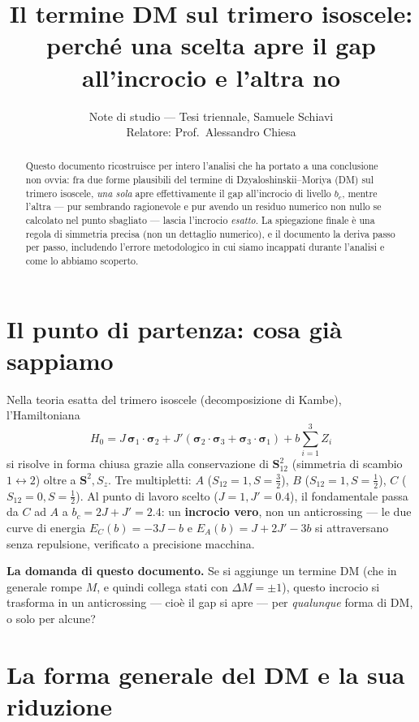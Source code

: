 \documentclass[11pt,a4paper]{article}
\title{\bfseries Il termine DM sul trimero isoscele:\\
perché una scelta apre il gap all'incrocio e l'altra no}
\author{Note di studio — Tesi triennale, Samuele Schiavi\\ \small Relatore: Prof.\ Alessandro Chiesa}
\date{}
\begin{document}
\maketitle
\thispagestyle{fancy}

\begin{abstract}
\noindent
Questo documento ricostruisce per intero l'analisi che ha portato a una conclusione
non ovvia: fra due forme plausibili del termine di Dzyaloshinskii--Moriya (DM) sul
trimero isoscele, \emph{una sola} apre effettivamente il gap all'incrocio di livello
$b_c$, mentre l'altra — pur sembrando ragionevole e pur avendo un residuo numerico
non nullo se calcolato nel punto sbagliato — lascia l'incrocio \emph{esatto}. La
spiegazione finale è una regola di simmetria precisa (non un dettaglio numerico), e il
documento la deriva passo per passo, includendo l'errore metodologico in cui siamo
incappati durante l'analisi e come lo abbiamo scoperto.
\end{abstract}

\section{Il punto di partenza: cosa già sappiamo}

Nella teoria esatta del trimero isoscele (decomposizione di Kambe), l'Hamiltoniana
\[
H_0 = J\,\boldsymbol\sigma_1\cdot\boldsymbol\sigma_2
+ J'(\boldsymbol\sigma_2\cdot\boldsymbol\sigma_3+\boldsymbol\sigma_3\cdot\boldsymbol\sigma_1)
+ b\sum_{i=1}^3 Z_i
\]
si risolve in forma chiusa grazie alla conservazione di $\mathbf S_{12}^2$ (simmetria
di scambio $1\leftrightarrow2$) oltre a $\mathbf S^2,S_z$. Tre multipletti: $A$
($S_{12}{=}1,S{=}\tfrac32$), $B$ ($S_{12}{=}1,S{=}\tfrac12$), $C$
($S_{12}{=}0,S{=}\tfrac12$). Al punto di lavoro scelto ($J{=}1,J'{=}0.4$), il
fondamentale passa da $C$ ad $A$ a $b_c=2J+J'=2.4$: un \textbf{incrocio vero}, non un
anticrossing — le due curve di energia $E_C(b)=-3J-b$ e $E_A(b)=J+2J'-3b$ si
attraversano senza repulsione, verificato a precisione macchina.

\textbf{La domanda di questo documento.} Se si aggiunge un termine DM (che in generale
rompe $M$, e quindi collega stati con $\Delta M=\pm1$), questo incrocio si trasforma
in un anticrossing — cioè il gap si apre — per \emph{qualunque} forma di DM, o solo
per alcune?

\section{La forma generale del DM e la sua riduzione}
\end{document}
